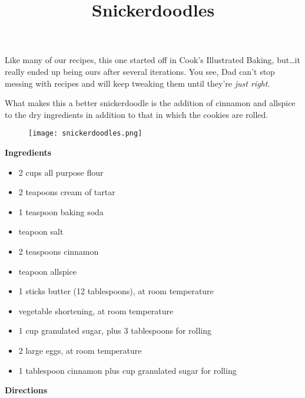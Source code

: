 \documentclass{article}
\title{Snickerdoodles}
\begin{document}
Like many of our recipes, this one started off in Cook's Illustrated Baking, but\dots it really
ended up being ours after several iterations. You see, Dad can't stop messing with recipes and will
keep tweaking them until they're \textit{just right}.

What makes this a better snickerdoodle is the addition of cinnamon and allspice to the
dry ingredients in addition to that in which the cookies are rolled.

\begin{figure}
    \centering
    \texttt{[image: snickerdoodles.png]}
\end{figure}

\textbf{Ingredients}

\begin{multicols}{2}
    \begin{itemize}
        \item 2 cups all purpose flour
        \item 2 teapoons cream of tartar
        \item 1 teaspoon baking soda
        \item {} teapoon salt
        \item 2 teaspoons cinnamon
        \item {} teapoon allspice

        \item 1 sticks butter (12 tablespoons), at room temperature
        \item {} vegetable shortening, at room temperature
        \item 1 cup granulated sugar, plus 3 tablespoons for rolling
        \item 2 large eggs, at room temperature
        \item 1 tablespoon cinnamon plus  cup granulated sugar for rolling
    \end{itemize}
\end{multicols}

\textbf{Directions}
\end{document}
